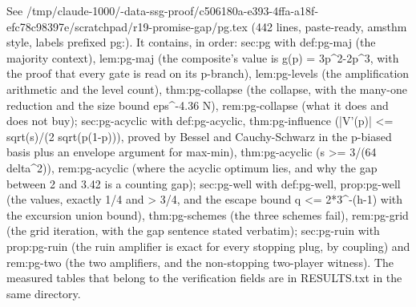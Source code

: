 See /tmp/claude-1000/-data-ssg-proof/c506180a-e393-4ffa-a18f-efc78c98397e/scratchpad/r19-promise-gap/pg.tex (442 lines, paste-ready, amsthm style, labels prefixed pg:). It contains, in order: sec:pg with def:pg-maj (the majority context), lem:pg-maj (the composite's value is g(p) = 3p^2-2p^3, with the proof that every gate is read on its p-branch), lem:pg-levels (the amplification arithmetic and the level count), thm:pg-collapse (the collapse, with the many-one reduction and the size bound eps^{-4.36} N), rem:pg-collapse (what it does and does not buy); sec:pg-acyclic with def:pg-acyclic, thm:pg-influence (|V'(p)| <= sqrt(s)/(2 sqrt(p(1-p))), proved by Bessel and Cauchy-Schwarz in the p-biased basis plus an envelope argument for max-min), thm:pg-acyclic (s >= 3/(64 delta^2)), rem:pg-acyclic (where the acyclic optimum lies, and why the gap between 2 and 3.42 is a counting gap); sec:pg-well with def:pg-well, prop:pg-well (the values, exactly 1/4 and > 3/4, and the escape bound q <= 2*3^{-(h-1)} with the excursion union bound), thm:pg-schemes (the three schemes fail), rem:pg-grid (the grid iteration, with the gap sentence stated verbatim); sec:pg-ruin with prop:pg-ruin (the ruin amplifier is exact for every stopping plug, by coupling) and rem:pg-two (the two amplifiers, and the non-stopping two-player witness). The measured tables that belong to the verification fields are in RESULTS.txt in the same directory.